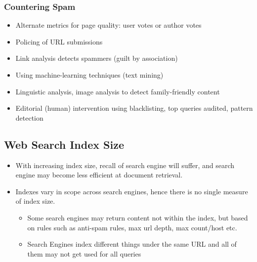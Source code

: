 \documentclass{article}
\begin{document}
\subsubsection{Countering Spam}
\begin{itemize}
    \item Alternate metrics for page quality: user votes or author votes
    
    \item Policing of URL submissions
    
    \item Link analysis detects spammers (guilt by association)
    
    \item Using machine-learning techniques (text mining)
    
    \item Linguistic analysis, image analysis to detect family-friendly content 
    
    \item Editorial (human) intervention using blacklisting, top queries audited, pattern detection
\end{itemize}

\subsection{Web Search Index Size}
\begin{itemize}
    \item With increasing index size, recall of search engine will suffer, and search engine may become less efficient at document retrieval. 
    
    \item Indexes vary in scope across search engines, hence there is no single measure of index size. 
    \begin{itemize}
        \item Some search engines may return content not within the index, but based on rules such as anti-spam rules, max url depth, max count/host etc.
        
        \item Search Engines index different things under the same URL and all of them may not get used for all queries
    \end{itemize}
\end{itemize}
\end{document}
